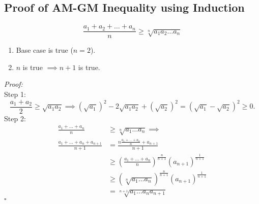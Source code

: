 \documentclass[a4paper,11pt]{article}
\begin{document}
\subsection{Proof of AM-GM Inequality using Induction}
\begin{tcolorbox}[breakable]
    \[
    \frac{a_1 + a_2 + \dots + a_n}{n} \geq \sqrt[n]{a_1 a_2 \dots a_n}
    \]
    \begin{enumerate}[label=\roman*.]
        \item Base case is true ($n=2$).
        \item $n$ is true $\implies n+1$ is true.
    \end{enumerate}
    \emph{Proof:} \\[6pt]
    Step 1:
    \[
    \frac{a_1 + a_2}{2} \geq \sqrt{a_1 a_2} \implies (\sqrt{a_1})^2 - 2\sqrt{a_1 a_2} + (\sqrt{a_2})^2 = (\sqrt{a_1} - \sqrt{a_2})^2 \geq 0.
    \]
    Step 2:
    \begin{align*}
        \frac{a_1 + \dots + a_n}{n} &\geq \sqrt[n]{a_1 \dots a_n} \implies\\
        \frac{a_1 + \dots + a_n + a_{n+1}}{n+1} &= \frac{ n \frac{a_1 + \dots + a_n}{n} + a_{n+1}}{n+1} \\  &\geq \left( \frac{a_1 + \dots + a_n}{n} \right)^{\frac{n}{n+1}} (a_{n+1})^{\frac{1}{n+1}} \\
        &\geq \left( \sqrt[n]{a_1 \dots a_n} \right)^{\frac{n}{n+1}} (a_{n+1})^{\frac{1}{n+1}} \\
        &= \sqrt[n+1]{a_1 \dots a_n a_{n+1}} 
    \end{align*}
    \hfill$\square$
\end{tcolorbox}
\end{document}
